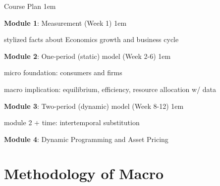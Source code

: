 \documentclass[11pt,aspectratio=43]{beamer}
\let\olditemize=\itemize
\let\endolditemize=\enditemize
\renewenvironment{itemize}{\olditemize \itemsep1em}{\endolditemize}
\theoremstyle{definition}
\begin{document}
\begin{frame}{Course Plan}
\label{slide:Course_Plan}
\begin{itemize}
    \item \textbf{Module 1}: Measurement (Week 1)
    \begin{itemize}
        \item stylized facts about Economics growth and business cycle
    \end{itemize}
    \item \textbf{Module 2}: One-period (\alert{static}) model (Week 2-6)
    \begin{itemize}
        \item micro foundation: consumers and firms
        \item macro implication: equilibrium, efficiency, resource allocation w/ data
    \end{itemize}
    \item \textbf{Module 3}: Two-period (\alert{dynamic}) model (Week 8-12)
    \begin{itemize}
        \item module 2 $ + $ time: \alert{intertemporal substitution}
    \end{itemize}
    \item \textbf{Module 4}: Dynamic Programming and Asset Pricing
\end{itemize}
\end{frame}

%
%
%

\section{Methodology of Macro}
\label{sec:Methodology_of_Macro}
\end{document}
